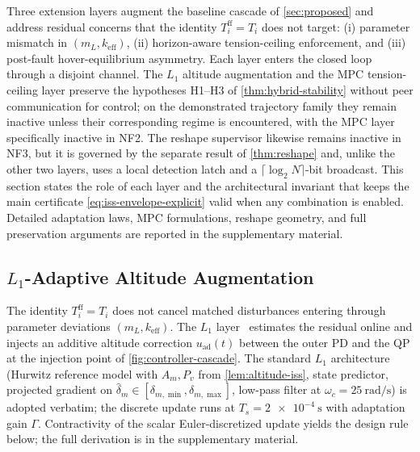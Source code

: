
Three extension layers augment the baseline cascade of \cref{sec:proposed} and address residual concerns that the identity $T_i^{\mathrm{ff}}=T_i$ does not target: (i) parameter mismatch in $(m_L, k_{\mathrm{eff}})$, (ii) horizon-aware tension-ceiling enforcement, and (iii) post-fault hover-equilibrium asymmetry. Each layer enters the closed loop through a disjoint channel. The $L_1$ altitude augmentation and the MPC tension-ceiling layer preserve the hypotheses H1--H3 of \cref{thm:hybrid-stability} without peer communication for control; on the demonstrated trajectory family they remain inactive unless their corresponding regime is encountered, with the MPC layer specifically inactive in NF2. The reshape supervisor likewise remains inactive in NF3, but it is governed by the separate result of \cref{thm:reshape} and, unlike the other two layers, uses a local detection latch and a $\lceil\log_2 N\rceil$-bit broadcast. This section states the role of each layer and the architectural invariant that keeps the main certificate \eqref{eq:iss-envelope-explicit} valid when any combination is enabled. Detailed adaptation laws, MPC formulations, reshape geometry, and full preservation arguments are reported in the supplementary material.

\subsection{$L_1$-Adaptive Altitude Augmentation}
\label{sec:l1-augmentation}

The identity $T_i^{\mathrm{ff}}=T_i$ does not cancel matched disturbances entering through parameter deviations $(m_L, k_{\mathrm{eff}})$. The $L_1$ layer~\cite{Hovakimyan2010book,CaoHovakimyan2008} estimates the residual online and injects an additive altitude correction $u_{\mathrm{ad}}(t)$ between the outer PD and the QP at the injection point of \cref{fig:controller-cascade}. The standard $L_1$ architecture (Hurwitz reference model with $A_m,P_v$ from \cref{lem:altitude-iss}, state predictor, projected gradient on $\hat\delta_m \in [\delta_{m,\min},\delta_{m,\max}]$, low-pass filter at $\omega_c=\SI{25}{\radian\per\second}$) is adopted verbatim; the discrete update runs at $T_s=\SI{2e-4}{\second}$ with adaptation gain $\Gamma$. Contractivity of the scalar Euler-discretized update yields the design rule below; the full derivation is in the supplementary material.

